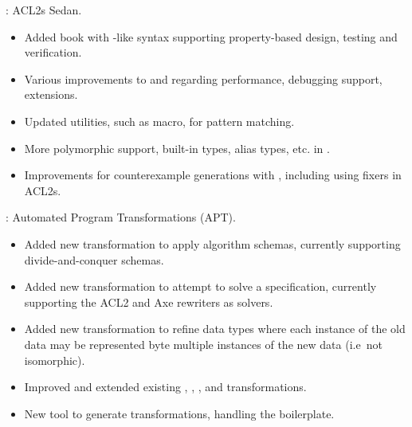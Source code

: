\begin{frame}

\implibtitle

: ACL2s Sedan.
\begin{itemize}
\item Added  book with -like syntax
  supporting property-based design, testing and verification.
\item Various improvements to  and 
  regarding performance, debugging support, extensions.
\item Updated utilities, such as  macro, for pattern matching.
\item More polymorphic support, built-in types, alias types, etc.
  in .
\item Improvements for counterexample generations with ,
  including using fixers in ACL2s.
\end{itemize}

\end{frame}


\begin{frame}

\implibtitle

:
Automated Program Transformations (APT).
\begin{itemize}
\item Added new  transformation to apply algorithm schemas,
      currently supporting divide-and-conquer schemas.
\item Added new  transformation to attempt to solve a specification,
      currently supporting the ACL2 and Axe rewriters as solvers.
\item Added new  transformation to refine data types
      where each instance of the old data may be represented byte
      multiple instances of the new data (i.e\ not isomorphic).
\item Improved and extended existing
      , , , and 
      transformations.
\item New  tool to generate transformations, handling
      the boilerplate.
\end{itemize}

\end{frame}

